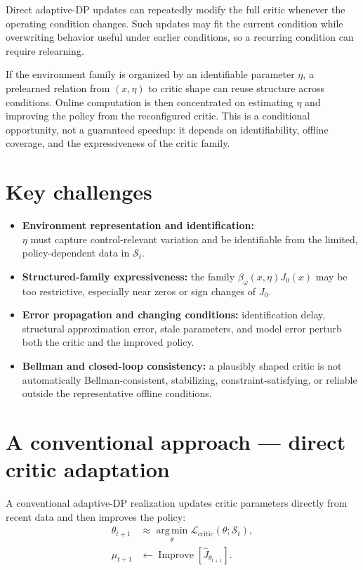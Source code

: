 \documentclass[a4paper]{article}
\begin{document}
Direct adaptive-DP updates can repeatedly modify the full critic whenever the
operating condition changes. Such updates may fit the current condition while
overwriting behavior useful under earlier conditions, so a recurring
condition can require relearning.

If the environment family is organized by an identifiable parameter $\eta$,
a prelearned relation from $(x,\eta)$ to critic shape can reuse structure
across conditions. Online computation is then concentrated on estimating
$\eta$ and improving the policy from the reconfigured critic. This is a
conditional opportunity, not a guaranteed speedup: it depends on
identifiability, offline coverage, and the expressiveness of the critic
family.

\section{Key challenges}

\begin{itemize}
  \item \textbf{Environment representation and identification:}\\
  $\eta$ must
  capture control-relevant variation and be identifiable from the limited,
  policy-dependent data in $\mathcal S_t$.
  \item \textbf{Structured-family expressiveness:} the family
  $\beta_\omega(x,\eta)J_0(x)$ may be too restrictive, especially near zeros
  or sign changes of $J_0$.
  \item \textbf{Error propagation and changing conditions:} identification
  delay, structural approximation error, stale parameters, and model error
  perturb both the critic and the improved policy.
  \item \textbf{Bellman and closed-loop consistency:} a plausibly shaped
  critic is not automatically Bellman-consistent, stabilizing,
  constraint-satisfying, or reliable outside the representative offline
  conditions.
\end{itemize}

\section{A conventional approach --- direct critic adaptation}

A conventional adaptive-DP realization updates critic parameters directly
from recent data and then improves the policy:
\begin{equation}
  \begin{aligned}
    \theta_{t+1}
    &\approx
    \operatorname*{arg\,min}_{\theta}
    \mathcal L_{\mathrm{critic}}(\theta;\mathcal S_t),\\
    \widehat\mu_{t+1}
    &\leftarrow
    \operatorname{Improve}
    \!\left[\widehat J_{\theta_{t+1}}\right].
  \end{aligned}
\end{equation}
\end{document}
